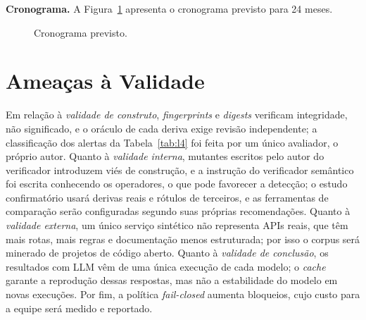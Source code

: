 \documentclass[12pt]{article}
\begin{document}
\textbf{Cronograma.} A Figura~\ref{fig:cronograma} apresenta o cronograma previsto para 24 meses.

\begin{figure}[!ht]
\centering
{}
\caption{Cronograma previsto.}
\label{fig:cronograma}
\end{figure}

\section{Ameaças à Validade}
\label{sec7:ameacas}

Em relação à \textit{validade de construto}, \textit{fingerprints} e \textit{digests} verificam integridade, não significado, e o oráculo de cada deriva exige revisão independente; a classificação dos alertas da Tabela~\ref{tab:l4} foi feita por um único avaliador, o próprio autor. Quanto à \textit{validade interna}, mutantes escritos pelo autor do verificador introduzem viés de construção, e a instrução do verificador semântico foi escrita conhecendo os operadores, o que pode favorecer a detecção; o estudo confirmatório usará derivas reais e rótulos de terceiros, e as ferramentas de comparação serão configuradas segundo suas próprias recomendações. Quanto à \textit{validade externa}, um único serviço sintético não representa APIs reais, que têm mais rotas, mais regras e documentação menos estruturada; por isso o corpus será minerado de projetos de código aberto. Quanto à \textit{validade de conclusão}, os resultados com LLM vêm de uma única execução de cada modelo; o \textit{cache} garante a reprodução dessas respostas, mas não a estabilidade do modelo em novas execuções. Por fim, a política \textit{fail-closed} aumenta bloqueios, cujo custo para a equipe será medido e reportado.
\end{document}
